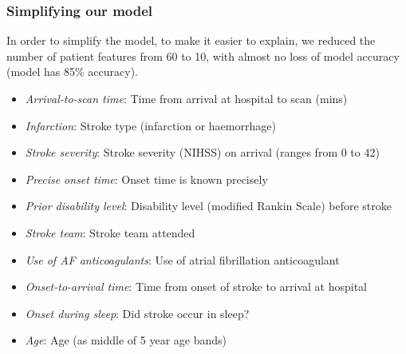 \begin{frame}
\frametitle{Simplifying our model}

In order to simplify the model, to make it easier to explain, we reduced the number of patient features from 60 to 10, with almost no loss of model accuracy (model has 85\% accuracy).

\small
\begin{itemize}
    \item \emph{Arrival-to-scan time}: Time from arrival at hospital to scan (mins)
    \item \emph{Infarction}: Stroke type (infarction or haemorrhage)
    \item \emph{Stroke severity}: Stroke severity (NIHSS) on arrival (ranges from 0 to 42)
    \item \emph{Precise onset time}: Onset time is known precisely
    \item \emph{Prior disability level}: Disability level (modified Rankin Scale) before stroke
    \item \emph{Stroke team}: Stroke team attended
    \item \emph{Use of AF anticoagulants}: Use of atrial fibrillation anticoagulant
    \item \emph{Onset-to-arrival time}: Time from onset of stroke to arrival at hospital
    \item \emph{Onset during sleep}: Did stroke occur in sleep?
    \item \emph{Age}: Age (as middle of 5 year age bands)
\end{itemize}
\end{frame}
